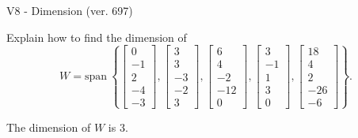 \begin{exercise}
  \begin{exerciseTitle}V8 - Dimension (ver. 697)\end{exerciseTitle}
  \begin{exerciseStatement}
    Explain how to find the dimension of 
\[W=\mathrm{span}\ \left\{\left[\begin{array}{r}
0 \\
-1 \\
2 \\
-4 \\
-3
\end{array}\right] , \left[\begin{array}{r}
3 \\
3 \\
-3 \\
-2 \\
3
\end{array}\right] , \left[\begin{array}{r}
6 \\
4 \\
-2 \\
-12 \\
0
\end{array}\right] , \left[\begin{array}{r}
3 \\
-1 \\
1 \\
3 \\
0
\end{array}\right] , \left[\begin{array}{r}
18 \\
4 \\
2 \\
-26 \\
-6
\end{array}\right]\right\}.\]



  \end{exerciseStatement}
  \begin{exerciseAnswer}
   The dimension of \(W\) is  \(3\).
  


  \end{exerciseAnswer}
\end{exercise}